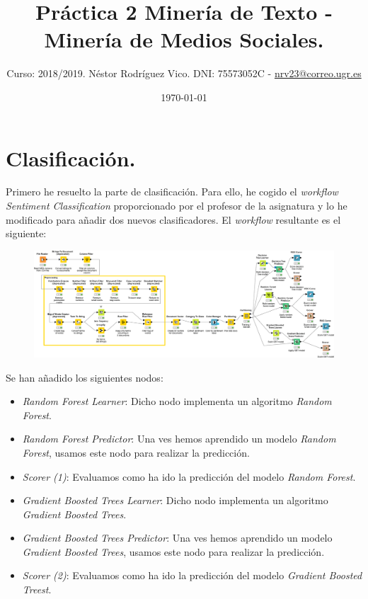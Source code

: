 \documentclass[11pt]{article}
\title{Práctica 2 Minería de Texto - Minería de Medios Sociales.}
\author{Curso: 2018/2019. Néstor Rodríguez Vico. DNI: 75573052C - \href{mailto:nrv23@correo.ugr.es}{nrv23@correo.ugr.es}}
\date{\today}
\begin{document}
\maketitle

\section{Clasificación.}

Primero he resuelto la parte de clasificación. Para ello, he cogido el \textit{workflow} \textit{Sentiment Classification} proporcionado por el profesor de la asignatura y lo he modificado para añadir dos nuevos clasificadores. El \textit{workflow} resultante es el siguiente:

\begin{figure}[H]
	\centering
	\includegraphics[width=\linewidth]{images/class_wf.eps}
\end{figure}

Se han añadido los siguientes nodos:

\begin{itemize}
	\item \textit{Random Forest Learner}: Dicho nodo implementa un algoritmo \textit{Random Forest}.
	\item \textit{Random Forest Predictor}: Una ves hemos aprendido un modelo \textit{Random Forest}, usamos este nodo para realizar la predicción.
	\item \textit{Scorer (1)}: Evaluamos como ha ido la predicción del modelo \textit{Random Forest}.
	\item \textit{Gradient Boosted Trees Learner}: Dicho nodo implementa un algoritmo \textit{Gradient Boosted Trees}.
	\item \textit{Gradient Boosted Trees Predictor}: Una ves hemos aprendido un modelo \textit{Gradient Boosted Trees}, usamos este nodo para realizar la predicción.
	\item \textit{Scorer (2)}: Evaluamos como ha ido la predicción del modelo \textit{Gradient Boosted Treest}.
\end{itemize}
\end{document}
